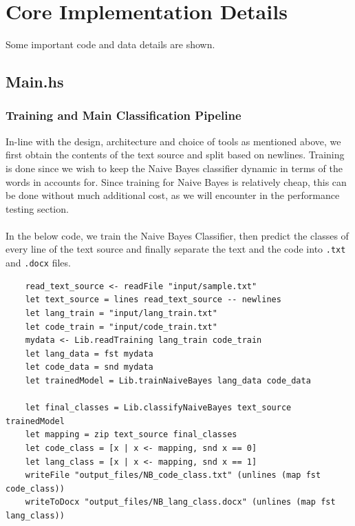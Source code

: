 \documentclass[12pt]{scrreprt}
\newcommand{\ttt}[1]{\texttt{#1}}
\begin{document}
\section{Core Implementation Details}

Some important code and data details are shown.




\subsection{Main.hs}

\subsubsection{Training and Main Classification Pipeline}
In-line with the design, architecture and choice of tools as mentioned above, we first obtain the contents of the text source and split based on newlines. Training is done since we wish to keep the Naive Bayes classifier dynamic in terms of the words in accounts for. Since training for Naive Bayes is relatively cheap, this can be done without much additional cost, as we will encounter in the performance testing section.\\
\\ In the below code, we train the Naive Bayes Classifier, then predict the classes of every line of the text source and finally separate the text and the code into \ttt{.txt} and \ttt{.docx} files.

\begin{verbatim}
    read_text_source <- readFile "input/sample.txt"
    let text_source = lines read_text_source -- newlines
    let lang_train = "input/lang_train.txt"
    let code_train = "input/code_train.txt"
    mydata <- Lib.readTraining lang_train code_train
    let lang_data = fst mydata
    let code_data = snd mydata
    let trainedModel = Lib.trainNaiveBayes lang_data code_data

    let final_classes = Lib.classifyNaiveBayes text_source trainedModel
    let mapping = zip text_source final_classes
    let code_class = [x | x <- mapping, snd x == 0]
    let lang_class = [x | x <- mapping, snd x == 1]
    writeFile "output_files/NB_code_class.txt" (unlines (map fst code_class))
    writeToDocx "output_files/NB_lang_class.docx" (unlines (map fst lang_class))
   \end{verbatim}
   
\end{document}
